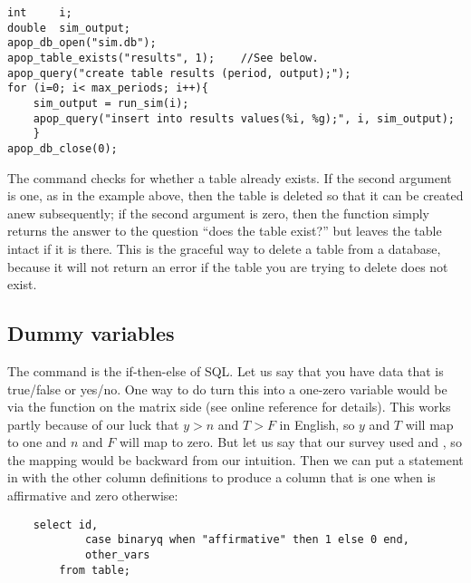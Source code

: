 \begin{lstlisting}
int     i;
double  sim_output;
apop_db_open("sim.db");
apop_table_exists("results", 1);    //See below.
apop_query("create table results (period, output);");
for (i=0; i< max_periods; i++){
    sim_output = run_sim(i);
    apop_query("insert into results values(%i, %g);", i, sim_output);
    }
apop_db_close(0);
\end{lstlisting}

The  command checks for whether a table
already exists. If the second argument is one, as in the example above,
then the table is deleted so that it can be created anew subsequently;
if the second argument is zero, then the function simply returns the
answer to the question ``does the table exist?'' but leaves the table
intact if it is there. This is the graceful way to delete a table from
a database, because it will not return an error if the table you are
trying to delete does not exist.

\subsection{Dummy variables} 
The  command is the if-then-else of SQL. Let us say that you
have data that is true/false or yes/no. One way to do turn this into a
one-zero variable would be via
the  function on the matrix side
(see online reference for details). 
This works partly because of our
luck that $y > n$ and $T > F$ in English, so $y$ and $T$ will map to one
and $n$ and $F$ will map to zero. But let us say that our survey used
 and , so the mapping would be
backward from our intuition.  Then we can put a  statement in with the other
column definitions to produce a column that is one when
 is affirmative and zero otherwise:
\begin{lstlisting}
    select id, 
            case binaryq when "affirmative" then 1 else 0 end, 
            other_vars
        from table;
\end{lstlisting}



